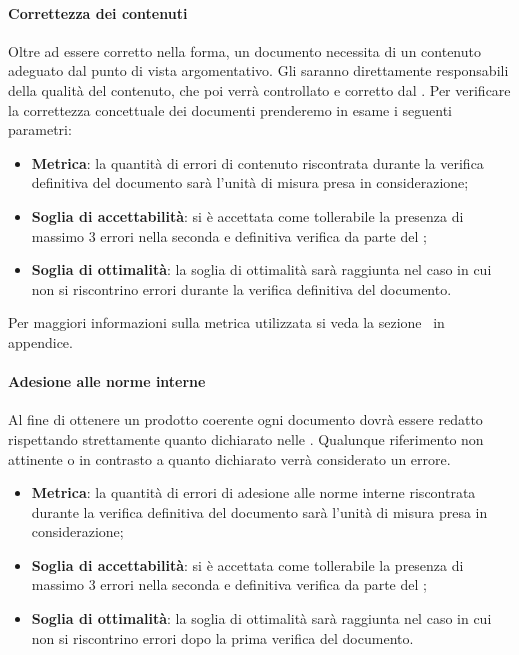 \paragraph{Correttezza dei contenuti}
Oltre ad essere corretto nella forma, un documento necessita di un contenuto adeguato dal punto di vista argomentativo. Gli \anas{} saranno direttamente responsabili della qualità del contenuto, che poi verrà controllato e corretto dal \ver{}.
Per verificare la correttezza concettuale dei documenti prenderemo in esame i seguenti parametri:
\begin{itemize}
	\item \textbf{Metrica}: la quantità di errori di contenuto riscontrata durante la verifica definitiva del documento sarà l'unità di misura presa in considerazione;
	\item \textbf{Soglia di accettabilità}: si è accettata come tollerabile la presenza di massimo 3 errori nella seconda e definitiva verifica da parte del \ver{};
	\item \textbf{Soglia di ottimalità}: la soglia di ottimalità sarà raggiunta nel caso in cui non si riscontrino errori durante la verifica definitiva del documento.
\end{itemize}

Per maggiori informazioni sulla metrica utilizzata si veda la sezione~ in appendice.

\paragraph{Adesione alle norme interne}
Al fine di ottenere un prodotto coerente ogni documento dovrà essere redatto rispettando strettamente quanto dichiarato nelle \NdP{}.
Qualunque riferimento non attinente o in contrasto a quanto dichiarato verrà considerato un errore.
\begin{itemize}
	\item \textbf{Metrica}: la quantità di errori di adesione alle norme interne riscontrata durante la verifica definitiva del documento sarà l'unità di misura presa in considerazione;
	\item \textbf{Soglia di accettabilità}: si è accettata come tollerabile la presenza di massimo 3 errori nella seconda e definitiva verifica da parte del \ver{};
	\item \textbf{Soglia di ottimalità}: la soglia di ottimalità sarà raggiunta nel caso in cui non si riscontrino errori dopo la prima verifica del documento.
\end{itemize}

